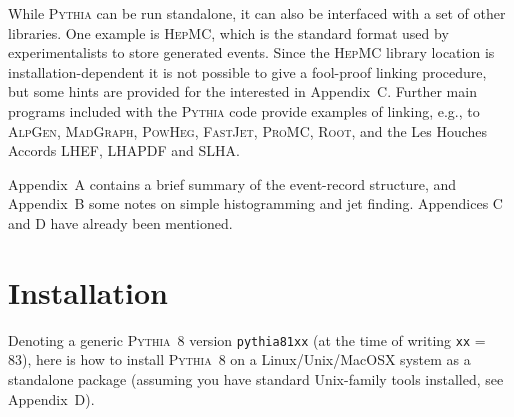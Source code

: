 \documentclass[12pt,a4paper]{article}
\begin{document}
While \textsc{Pythia} can be run standalone, it can also be interfaced 
with a set of other libraries. One example is \textsc{HepMC}, which 
is the standard format used by experimentalists to store generated 
events. Since the \textsc{HepMC} library location is 
installation-dependent it is not possible to give a fool-proof linking 
procedure, but some hints are provided for the interested in Appendix~C. 
Further main programs included with the \textsc{Pythia} code provide 
examples of linking, e.g., to \textsc{AlpGen}, \textsc{MadGraph}, 
\textsc{PowHeg}, \textsc{FastJet}, \textsc{ProMC}, \textsc{Root},
and the Les Houches Accords LHEF, LHAPDF and SLHA.

Appendix~A contains a brief summary of the event-record structure, 
and Appendix~B some notes on simple histogramming and jet finding.
Appendices C and D have already been mentioned.

\section{Installation \label{sec:installation}}

Denoting a generic \textsc{Pythia}~8 version \texttt{pythia81xx}
(at the time of writing \texttt{xx} = 83), here is how to install 
\textsc{Pythia}~8 on a Linux/Unix/MacOSX system as a standalone package
(assuming you have standard Unix-family tools installed, see Appendix~D). 
\end{document}
